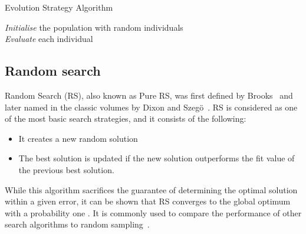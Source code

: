 
\begin{algorithm}[H]
\caption{Evolution Strategy Algorithm}
\label{evolution_alg}
\SetAlgoLined
    \textit{Initialise} the population with random individuals\;\\
    \textit{Evaluate} each individual
\end{algorithm}

\subsection{Random search} 

Random Search (RS), also known as Pure RS, was first defined by Brooks~\cite{10.2307/167616} and later named in the classic volumes by Dixon and Szeg{\"o}~\cite{doi:10.1002/zamm.19790590220}. RS is considered as one of the most basic search strategies, and it consists of the following:

\begin{itemize}
    \item It creates a new random solution
    \item The best solution is updated if the new solution outperforms the fit value of the previous best solution.
\end{itemize}

While this algorithm sacrifices the guarantee of determining the optimal solution within a given error, it can be shown that RS converges to the global optimum with a probability one \cite{zabinsky2013stochastic}. It is commonly used to compare the performance of other search algorithms to random sampling~\cite{de2017james}.

